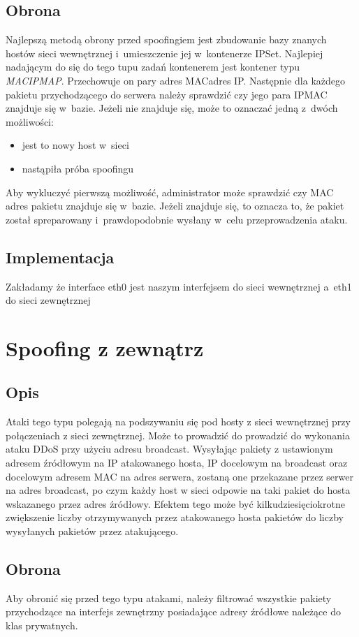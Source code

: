 \documentclass[a4paper,12pt,oneside]{book}
\begin{document}
		\subsection{Obrona}
			Najlepszą metodą obrony przed spoofingiem jest zbudowanie bazy znanych hostów sieci wewnętrznej i~umieszczenie jej w~kontenerze IPSet.
			Najlepiej nadającym do się do tego tupu zadań kontenerem jest kontener typu \textit{MACIPMAP}.
			Przechowuje on pary adres MAC\dywiz adres IP.
			Następnie dla każdego pakietu przychodzącego do serwera należy sprawdzić czy jego para IP\dywiz MAC znajduje się w~bazie.
			Jeżeli nie znajduje się, może to oznaczać jedną z~dwóch możliwości:
			\begin{itemize}
				\item jest to nowy host w~sieci
				\item nastąpiła próba spoofingu
			\end{itemize}
			Aby wykluczyć pierwszą możliwość, administrator może sprawdzić czy MAC adres pakietu znajduje się w~bazie.
			Jeżeli znajduje się, to oznacza to, że pakiet został spreparowany i~prawdopodobnie wysłany w~celu przeprowadzenia ataku.
		\subsection{Implementacja}
			\footnotesize
			Zakładamy że interface eth0 jest naszym interfejsem do sieci wewnętrznej a~eth1 do sieci zewnętrznej
			\normalsize
	\section{Spoofing z zewnątrz}
		\subsection{Opis}
			Ataki tego typu polegają na podszywaniu się pod hosty z sieci wewnętrznej przy połączeniach z sieci zewnętrznej.
			Może to prowadzić do prowadzić do wykonania ataku DDoS przy użyciu adresu broadcast. 
			Wysyłając pakiety z ustawionym adresem źródłowym na IP atakowanego hosta, IP docelowym na broadcast oraz docelowym adresem MAC na adres serwera, zostaną one przekazane przez serwer na adres broadcast, po czym każdy host w sieci odpowie na taki pakiet do hosta wskazanego przez adres źródłowy.
			Efektem tego może być kilkudziesięciokrotne zwiększenie liczby otrzymywanych przez atakowanego hosta pakietów do liczby wysyłanych pakietów przez atakującego.
		\subsection{Obrona}
			Aby obronić się przed tego typu atakami, należy filtrować wszystkie pakiety przychodzące na interfejs zewnętrzny posiadające adresy źródłowe należące do klas prywatnych.
\end{document}
